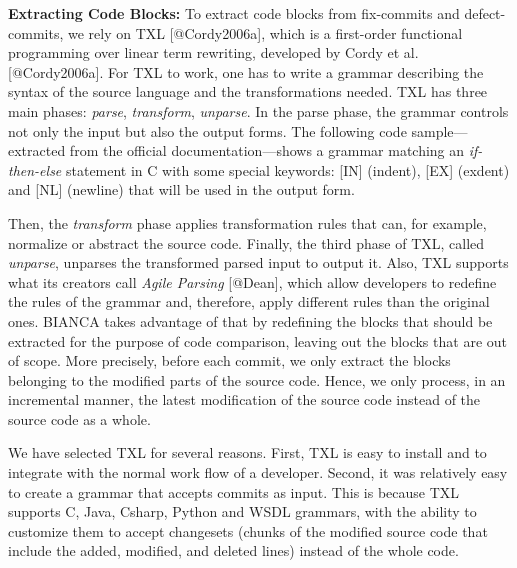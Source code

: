\textbf{Extracting Code Blocks:} To extract code blocks from fix-commits
and defect-commits, we rely on TXL {[}@Cordy2006a{]}, which is a
first-order functional programming over linear term rewriting, developed
by Cordy et al. {[}@Cordy2006a{]}. For TXL to work, one has to write a
grammar describing the syntax of the source language and the
transformations needed. TXL has three main phases: \emph{parse},
\emph{transform}, \emph{unparse}. In the parse phase, the grammar
controls not only the input but also the output forms. The following
code sample---extracted from the official documentation---shows a
grammar matching an \emph{if-then-else} statement in C with some special
keywords: {[}IN{]} (indent), {[}EX{]} (exdent) and {[}NL{]} (newline)
that will be used in the output form.

\begin{Shaded}
\begin{Highlighting}[]
 
   \KeywordTok{(} \NormalTok{[}\NormalTok{] }\KeywordTok{)} \NormalTok{[}\NormalTok{][NL]}
\NormalTok{[}\NormalTok{] [EX]}
\NormalTok{[} \NormalTok{else_statement]}
 

 
   \NormalTok{[}\NormalTok{][NL]}
\NormalTok{[}\NormalTok{] [EX]}
 
\end{Highlighting}
\end{Shaded}

Then, the \emph{transform} phase applies transformation rules that can,
for example, normalize or abstract the source code. Finally, the third
phase of TXL, called \emph{unparse}, unparses the transformed parsed
input to output it. Also, TXL supports what its creators call
\emph{Agile Parsing} {[}@Dean{]}, which allow developers to redefine the
rules of the grammar and, therefore, apply different rules than the
original ones. BIANCA takes advantage of that by redefining the blocks
that should be extracted for the purpose of code comparison, leaving out
the blocks that are out of scope. More precisely, before each commit, we
only extract the blocks belonging to the modified parts of the source
code. Hence, we only process, in an incremental manner, the latest
modification of the source code instead of the source code as a whole.

We have selected TXL for several reasons. First, TXL is easy to install
and to integrate with the normal work flow of a developer. Second, it
was relatively easy to create a grammar that accepts commits as input.
This is because TXL supports C, Java, Csharp, Python and WSDL grammars,
with the ability to customize them to accept changesets (chunks of the
modified source code that include the added, modified, and deleted
lines) instead of the whole code.

